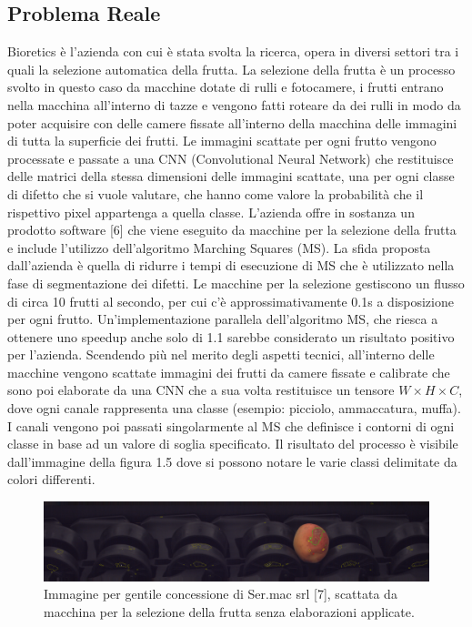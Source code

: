 \documentclass[12pt,a4paper]{report}
\begin{document}
\subsection{Problema Reale}
Bioretics è l'azienda con cui è stata svolta la ricerca, opera in diversi settori tra i quali la selezione automatica della frutta. La selezione della frutta è un processo svolto in questo caso da macchine dotate di rulli e fotocamere, i frutti entrano nella macchina all'interno di tazze e vengono fatti roteare da dei rulli in modo da poter acquisire con delle camere fissate all'interno della macchina delle immagini di tutta la superficie dei frutti. Le immagini scattate per ogni frutto vengono processate e passate a una CNN (Convolutional Neural Network) che restituisce delle matrici della stessa dimensioni delle immagini scattate, una per ogni classe di difetto che si vuole valutare, che hanno come valore la probabilità che il rispettivo pixel appartenga a quella classe. \newline
L'azienda offre in sostanza un prodotto software [6] che viene eseguito da macchine per la selezione della frutta e include l’utilizzo dell'algoritmo Marching Squares (MS). La sfida proposta dall'azienda è quella di ridurre i tempi di esecuzione di MS che è utilizzato nella fase di segmentazione dei difetti.
Le macchine per la selezione gestiscono un flusso di circa 10 frutti al secondo, per cui c'è approssimativamente 0.1s a disposizione per ogni frutto. Un’implementazione parallela dell’algoritmo MS, che riesca a ottenere uno speedup anche solo di 1.1 sarebbe considerato un risultato positivo per l’azienda.
Scendendo più nel merito degli aspetti tecnici, all’interno delle macchine vengono scattate immagini dei frutti da camere fissate e calibrate che sono poi elaborate da una CNN che a sua volta restituisce un tensore $W\times H\times C$, dove ogni canale rappresenta una classe (esempio: picciolo, ammaccatura, muffa).
I canali vengono poi passati singolarmente al MS che definisce i contorni di ogni classe in base ad un valore di soglia specificato. Il risultato del processo è visibile dall’immagine della figura 1.5 dove si possono notare le varie classi delimitate da colori differenti. \newline
\begin{figure}[H]
    \centering
    \includegraphics[scale=0.25]{img/marching_squares_00000052_00000001.png}
    \caption{Immagine per gentile concessione di Ser.mac srl [7], scattata da macchina per la selezione della frutta senza elaborazioni applicate.}
\end{figure} 
\end{document}
